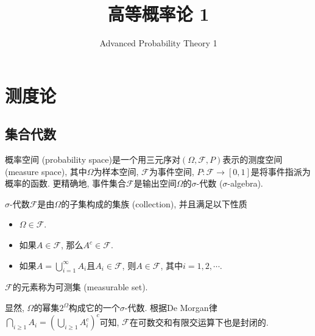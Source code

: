 \documentclass[cn, 12pt, math=mtpro2, bibstyle=apa, blue, twocol]{elegantbook}
\title{高等概率论 1}
\subtitle{Advanced Probability Theory 1}
\newcommand{\F}{\mathcal{F}}
\newcommand{\PP}{P}
\begin{document}
\maketitle
\frontmatter

\tableofcontents

\mainmatter

\chapter{测度论}
\section{集合代数}

概率空间 (probability space)是一个用三元序对$(\Omega,\F,\PP)$表示的测度空间 (measure space), 其中$\Omega$为样本空间, $\F$为事件空间, $\PP:\F\to[0,1]$是将事件指派为概率的函数. 更精确地, 事件集合$\F$是输出空间$\Omega$的$\sigma$-代数 ($\sigma$-algebra).

\begin{definition}
$\sigma$-代数$\F$是由$\Omega$的子集构成的集族 (collection), 并且满足以下性质
\begin{itemize}
  \item $\Omega\in\F$.
  \item 如果$A\in\F$, 那么$A^c\in\F$.
  \item 如果$A=\bigcup_{i=1}^\infty A_i$且$A_i\in\F$, 则$A\in\F$, 其中$i=1,2,\cdots$.
\end{itemize}
$\F$的元素称为可测集 (measurable set).
\end{definition}

显然, $\Omega$的幂集$2^\Omega$构成它的一个$\sigma$-代数. 根据De Morgan律$\bigcap_{i\ge1} A_i=(\bigcup_{i\ge1} A_i^c)^c$可知, $\F$在可数交和有限交运算下也是封闭的.
\end{document}
